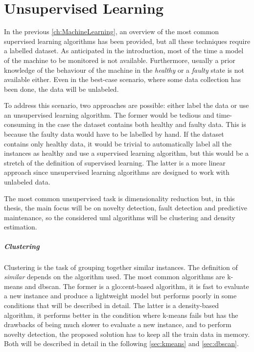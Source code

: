 \chapter{Unsupervised Learning}
\label{ch:Unsupervised}

In the previous \autoref{ch:MachineLearning}, an overview of the most common supervised learning algorithms has been provided, but all these techniques require a labelled dataset. As anticipated in the introduction, most of the time a model of the machine to be monitored is not available. Furthermore, usually a prior knowledge of the behaviour of the machine in the \emph{healthy} or a \emph{faulty} state is not available either. Even in the best-case scenario, where some data collection has been done, the data will be unlabeled. 

To address this scenario, two approaches are possible: either label the data or use an unsupervised learning algorithm. The former would be tedious and time-consuming in the case the dataset contains both healthy and faulty data. This is because the faulty data would have to be labelled by hand. If the dataset contains only healthy data, it would be trivial to automatically label all the instances as healthy and use a supervised learning algorithm, but this would be a stretch of the definition of supervised learning. The latter is a more linear approach since unsupervised learning algorithms are designed to work with unlabeled data.

The most common unsupervised task is dimensionality reduction  but, in this thesis, the main focus will be on novelty detection, fault detection and predictive maintenance, so the considered \gls{uml} algorithms will be clustering and density estimation.

\paragraph[]{Clustering}
Clustering is the task of grouping together similar instances. The definition of \emph{similar} depends on the algorithm used. The most common algorithms are {k-means} and \gls{dbscan}. The former is a \gls{glo:cent}-based algorithm, it is fast to evaluate a new instance and produce a lightweight model but performs poorly in some conditions that will be described in detail. The latter is a density-based algorithm, it performs better in the condition where k-means fails but has the drawbacks of being much slower to evaluate a new instance, and to perform novelty detection, the proposed solution has to keep all the train data in memory. Both will be described in detail in the following \autoref{sec:kmeans} and \autoref{sec:dbscan}.

